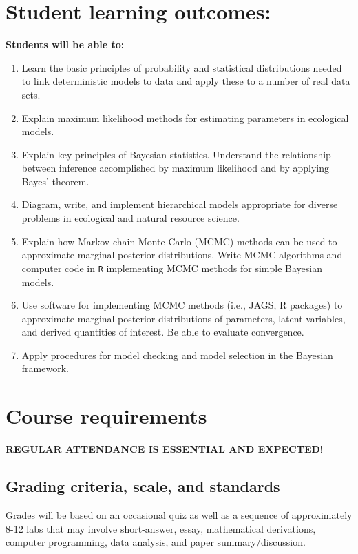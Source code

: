 \documentclass[11pt, a4paper]{article}
\begin{document}

\section*{Student learning outcomes:}
\textbf{Students will be able to:}
\begin{enumerate}
\item Learn the basic principles of probability and statistical
  distributions needed to link deterministic models to data and apply these to a number of real data sets.
\item Explain maximum likelihood methods for estimating parameters in
  ecological models.
\item Explain key principles of Bayesian statistics. Understand the
  relationship between inference accomplished by maximum likelihood
  and by applying Bayes’ theorem.
\item Diagram, write, and implement hierarchical models
  appropriate for diverse problems in ecological and natural resource science.
\item Explain how Markov chain Monte Carlo (MCMC) methods can be used
  to approximate marginal posterior distributions. Write MCMC
  algorithms and computer code in \texttt{R} implementing MCMC methods
  for simple Bayesian models.
\item Use software for implementing MCMC methods (i.e., JAGS, R
  packages) to approximate marginal posterior distributions of
  parameters, latent variables, and derived quantities of interest. Be
  able to evaluate convergence.
\item Apply procedures for model checking and model selection in
  the Bayesian framework.
\end{enumerate}


\section*{Course requirements}
\noindent \textbf{REGULAR ATTENDANCE IS ESSENTIAL AND EXPECTED}! 


\subsection*{Grading criteria, scale, and standards}

\noindent Grades will be based on an occasional quiz as well as a
sequence of approximately 8-12 labs that may involve
short-answer, essay, mathematical derivations, computer programming,
data analysis, and paper summary/discussion.
\end{document}
